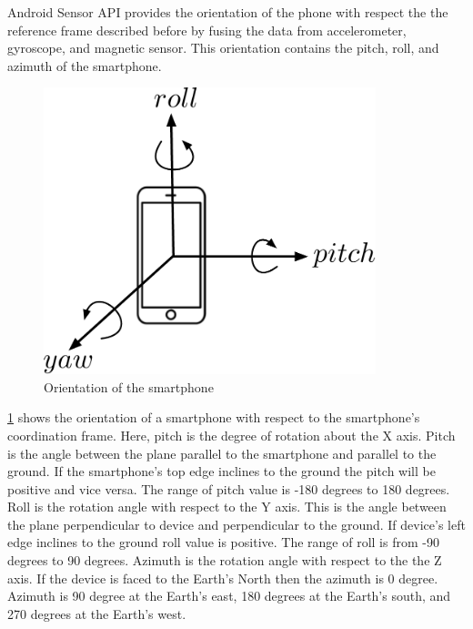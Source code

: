 Android Sensor API  provides the orientation of the phone with respect the the reference frame described before by fusing the data from accelerometer, gyroscope, and magnetic sensor. 
This orientation contains the pitch, roll, and azimuth of the smartphone. 

%

\begin{figure}
\centering
\includegraphics[width=3.8in]{figures/roll_pitch_yaw.pdf}
\caption{Orientation of the smartphone}
\label{f:rpy_dia}
\end{figure}

\ref{f:rpy_dia} shows the orientation of a smartphone with respect to the smartphone's coordination frame.
Here, pitch is the degree of rotation about the X axis.
Pitch is the angle between the plane parallel to the smartphone and parallel to the ground. 
If the smartphone's top edge inclines to the ground the pitch will be positive and vice versa.
The range of pitch value is -180 degrees to 180 degrees.
Roll is the rotation angle with respect to the Y axis.
This is the angle between the plane perpendicular to device and perpendicular to the ground.
If device's left edge inclines to the ground roll value is positive.
The range of roll is from -90 degrees to 90 degrees.
Azimuth is the rotation angle with respect to the the Z axis.
If the device is faced to the Earth's North then the azimuth is 0 degree.
Azimuth is 90 degree at the Earth's east, 180 degrees at the Earth's south, and 270 degrees at the Earth's west.


